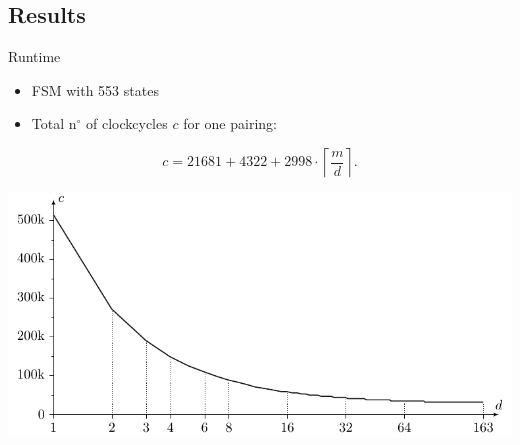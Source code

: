 \documentclass[svgnames, handout,t]{beamer}
\newenvironment{changemargin}[2]{%
\begin{list}{}{%
\setlength{\topsep}{0pt}%
\setlength{\leftmargin}{#1}%
\setlength{\rightmargin}{#2}%
\setlength{\listparindent}{\parindent}%
\setlength{\itemindent}{\parindent}%
\setlength{\parsep}{\parskip}%
}%
\item[]}{\end{list}}
\begin{document}
\subsection*{Results}
\begin{frame}{Runtime}
	\begin{itemize}
		\item FSM with 553 states
		\item Total n$^{\circ}$ of clockcycles $c$ for one pairing:
	\end{itemize}
	\[c = 21681 + 4322 + 2998 \cdot \left\lceil \frac{m}{d} \right\rceil.\]
	
	\vfill
	
	\begin{changemargin}{-4cm}{-4cm}
		\begin{center}\includegraphics[height=0.4\paperheight]{images/results-multi-cycles}\end{center}
	\end{changemargin}
\end{frame}
\end{document}

